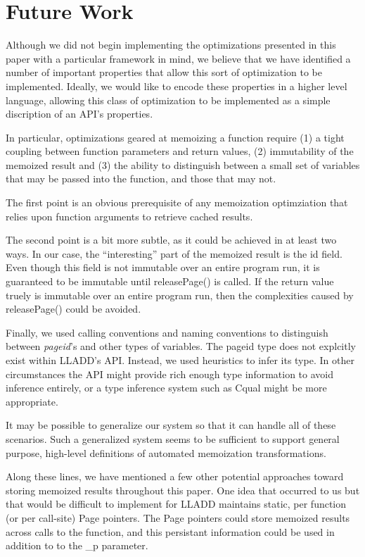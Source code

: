 \documentclass[10pt,letterpaper,twocolumn,english]{article}
\newcommand{\yad}{LLADD\xspace}
\newcommand{\unpin}{releasePage()\xspace}
\newcommand{\PP}{\_p\xspace}
\begin{document}
\section{Future Work}
Although we did not begin implementing the optimizations presented in
this paper with a particular framework in mind, we believe that we
have identified a number of important properties that allow this sort
of optimization to be implemented.  Ideally, we would like to encode
these properties in a higher level language, allowing this class of 
optimization to be implemented as a simple discription of an API's properties.

In particular, optimizations geared at memoizing a function require
(1) a tight coupling between function parameters and return values,
(2) immutability of the memoized result and (3) the ability to distinguish
between a small set of variables that may be passed into the function,
and those that may not.

The first point is an obvious prerequisite of any memoization
optimziation that relies upon function arguments to retrieve cached
results.  

The second point is a bit more subtle, as it could be
achieved in at least two ways.  In our case, the ``interesting'' part of the
memoized result is the id field.  Even
though this field is not immutable over an entire program run, it is
guaranteed to be immutable until \unpin is called.  If the return
value truely is immutable over an entire program run, then the
complexities caused by \unpin could be avoided.

Finally, we used calling conventions and naming conventions to
distinguish between {\em pageid}'s and other types of variables.  The
pageid type does not explcitly exist within \yad's API.  Instead, we
used heuristics to infer its type.  In other circumstances the API
might provide rich enough type information to avoid inference
entirely, or a type inference system such as Cqual might be more
appropriate.

It may be possible to generalize our system so that it can handle all
of these scenarios.  Such a generalized system seems to be sufficient
to support general purpose, high-level definitions of automated
memoization transformations.

Along these lines, we have mentioned a few other potential approaches
toward storing memoized results throughout this paper.  One idea that
occurred to us but that would be difficult to implement for \yad
maintains static, per function (or per call-site) Page pointers.  The
Page pointers could store memoized results across calls to the
function, and this persistant information could be used in addition to to
the \PP parameter.
\end{document}

